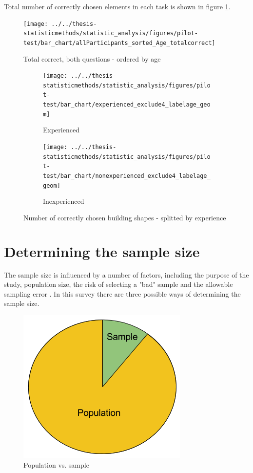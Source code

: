 Total number of correctly chosen elements in each task is shown in figure \ref{fig:allparticipantssortedagetotalcorrect}. 

\begin{figure}[H]
	\centering
	\texttt{[image: ../../thesis-statisticmethods/statistic\_analysis/figures/pilot-test/bar\_chart/allParticipants\_sorted\_Age\_totalcorrect]}
	\caption[Total correct, ordered by age]{Total correct, both questions - ordered by age}
	\label{fig:allparticipantssortedagetotalcorrect}
\end{figure}

\begin{figure}[H]
	\centering
	\begin{subfigure}[b]{0.45\textwidth}
		\centering
		\texttt{[image: ../../thesis-statisticmethods/statistic\_analysis/figures/pilot-test/bar\_chart/experienced\_exclude4\_labelage\_geom]}
		\caption{Experienced}
		\label{fig:experiencedexclude4labelagegeom}
	\end{subfigure}
	\begin{subfigure}[b]{0.45\textwidth}
		\centering
		\texttt{[image: ../../thesis-statisticmethods/statistic\_analysis/figures/pilot-test/bar\_chart/nonexperienced\_exclude4\_labelage\_geom]}
		\caption{Inexperienced}
		\label{fig:nonexperiencedexclude4labelagegeom}
	\end{subfigure}	
\caption[Correcly chosen shapes, sorted]{Number of correctly chosen building shapes - splitted by experience}
\end{figure}

\section[Sample Size]{Determining the sample size}
The sample size is influenced by a number of factors, including the purpose of the study, population size, the risk of selecting a "bad" sample and the allowable sampling error \citep{Israel1992}. In this survey there are three possible ways of determining the sample size. 

\begin{figure}[h]
	\centering
	\includegraphics[width=0.35\linewidth]{fig/popsample}
	\caption{Population vs. sample}
	\label{fig:popsample}
\end{figure}

